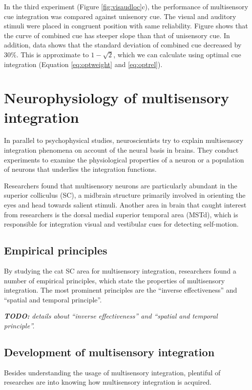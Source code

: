\documentclass{article}[11pt]
\newcommand{\TODO}[1]{\emph{\small{{\bf TODO: } #1}}}
\begin{document}
In the third experiment (Figure \ref{fig:visaudloc}c), the performance of multisensory cue integration was compared against unisenory cue. The visual and auditory stimuli were placed in congruent position with same reliability. Figure shows that the curve of combined cue has steeper slope than that of unisensory cue. In addition, data shows that the standard deviation of combined cue decreased by $30\%$. This is approximate to $1-\sqrt{2}$, which we can calculate using optimal cue integration (Equation \ref{eq:optweight} and \ref{eq:optrel}).

\section{Neurophysiology of multisensory integration}
In parallel to psychophysical studies, neuroscientists try to explain multisensory integration phenomena on account of the neural basis in brains.
They conduct experiments to examine the physiological properties of a neuron or a population of neurons that underlies the integration functions.

Researchers found that multisensory neurons are particularly abundant in the superior colliculus (SC), a midbrain structure primarily involved in orienting the eyes and head towards salient stimuli\cite{sparks_translation_1986}. Another area in brain that caught interest from researchers is the dorsal medial superior temporal area (MSTd), which is responsible for integration visual and vestibular cues for detecting self-motion\cite{gu_visual_2006}.

\subsection{Empirical principles}
By studying the cat SC area for multisensory integration, researchers found a number of empirical principles, which state the properties of multisensory integration\cite{meredith_interactions_1983}. The most prominent principles are the ``inverse effectiveness'' and ``spatial and temporal principle''.

\TODO{details about ``inverse effectiveness'' and ``spatial and temporal principle''.}

\subsection{Development of multisensory integration}
Besides understanding the usage of multisensory integration, plentiful of researches are into knowing how multisensory integration is acquired. 
\end{document}
